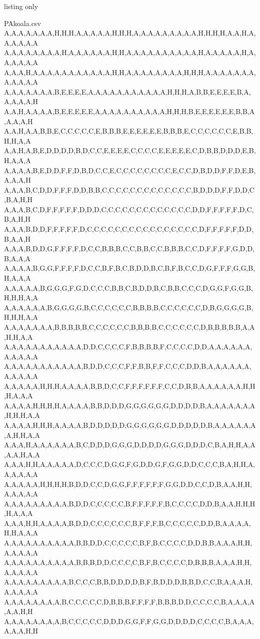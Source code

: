 \documentclass{article}
\begin{document}
\begin{PresentationCode}{listing only}
\begin{filecontents*}[overwrite]{PAkoala.csv}
A,A,A,A,A,A,A,H,H,H,A,A,A,A,A,H,H,H,A,A,A,A,A,A,A,A,A,H,H,H,H,A,A,H,A,A,A,A,A,A
A,A,A,A,A,A,A,A,H,A,A,A,A,A,A,H,H,A,A,A,A,A,A,A,A,A,A,H,A,A,A,A,A,H,A,A,A,A,A,A
A,A,A,H,A,A,A,A,A,A,A,A,A,A,A,H,H,A,A,A,A,A,A,A,A,H,H,H,A,A,A,A,A,A,A,A,A,A,A,A
A,A,A,A,A,A,A,B,E,E,E,E,A,A,A,A,A,A,A,A,A,A,A,H,H,H,A,B,B,E,E,E,E,B,A,A,A,A,A,H
A,A,H,A,A,A,A,B,E,E,E,E,E,A,A,A,A,A,A,A,A,A,A,H,H,H,B,E,E,E,E,E,E,B,B,A,A,A,A,H
A,A,H,A,A,B,B,E,C,C,C,C,C,E,B,B,B,E,E,E,E,E,E,B,B,B,E,C,C,C,C,C,C,E,B,B,H,H,A,A
A,A,H,A,B,E,D,D,D,D,B,D,C,C,E,E,E,E,C,C,C,C,E,E,E,E,E,C,D,B,B,D,D,D,E,B,H,A,A,A
A,A,A,A,B,E,D,D,F,F,D,B,D,C,C,E,C,C,C,C,C,C,C,C,E,C,C,D,B,D,D,F,F,D,E,B,A,A,A,H
A,A,A,B,C,D,D,F,F,F,D,D,B,B,C,C,C,C,C,C,C,C,C,C,C,C,C,B,D,D,D,F,F,D,D,C,B,A,H,H
A,A,A,B,C,D,F,F,F,F,F,D,D,D,C,C,C,C,C,C,C,C,C,C,C,C,C,D,D,F,F,F,F,F,D,C,B,A,H,H
A,A,A,B,D,D,F,F,F,F,F,D,C,C,C,C,C,C,C,C,C,C,C,C,C,C,C,C,D,F,F,F,F,F,D,D,B,A,A,H
A,A,A,B,D,D,G,F,F,F,F,D,C,C,B,B,B,C,C,B,B,C,C,B,B,B,C,C,D,F,F,F,F,G,D,D,B,A,A,A
A,A,A,A,B,G,G,F,F,F,F,D,C,C,B,F,B,C,B,D,D,B,C,B,F,B,C,C,D,G,F,F,F,G,G,B,H,A,A,A
A,A,A,A,A,B,G,G,G,F,G,D,C,C,C,B,B,C,B,D,D,B,C,B,B,C,C,C,D,G,G,F,G,G,B,H,H,H,A,A
A,A,A,A,A,A,B,G,G,G,G,B,C,C,C,C,C,C,B,B,B,B,C,C,C,C,C,C,D,B,G,G,G,G,B,H,H,H,A,A
A,A,A,A,A,A,A,B,B,B,B,B,C,C,C,C,C,C,B,B,B,B,C,C,C,C,C,C,D,B,B,B,B,B,A,A,H,H,A,A
A,A,A,A,A,A,A,A,A,A,A,D,D,C,C,C,C,F,B,B,B,B,F,C,C,C,C,D,D,A,A,A,A,A,A,A,A,A,A,A
A,A,A,A,A,A,A,A,A,A,A,B,D,D,C,C,C,F,F,B,B,F,F,C,C,C,D,D,B,A,A,A,A,A,A,A,A,A,A,A
A,A,A,A,A,H,H,H,A,A,A,A,B,B,D,C,C,F,F,F,F,F,F,C,C,D,B,B,A,A,A,A,A,A,H,H,H,A,A,A
A,A,A,A,H,H,H,H,A,A,A,A,B,B,D,D,D,G,G,G,G,G,G,D,D,D,D,B,A,A,A,A,A,A,A,H,H,H,A,A
A,A,A,A,H,H,H,A,A,A,A,B,D,D,D,D,D,G,G,G,G,G,G,D,D,D,D,D,B,A,A,A,A,A,A,A,H,H,A,A
A,A,A,H,A,A,A,A,A,A,B,C,D,D,D,G,G,G,D,D,D,D,G,G,G,D,D,D,C,B,A,H,H,A,A,A,A,H,A,A
A,A,A,H,H,A,A,A,A,A,D,C,C,C,D,G,G,F,G,D,D,G,F,G,G,D,D,C,C,C,B,A,H,H,A,A,A,A,A,A
A,A,A,A,A,H,H,H,H,B,D,D,C,C,D,G,G,F,F,F,F,F,F,G,G,D,D,C,C,D,B,A,A,H,H,A,A,A,A,A
A,A,A,A,A,A,A,A,A,B,D,D,C,C,C,C,C,B,F,F,F,F,F,B,C,C,C,C,D,D,B,A,A,H,H,H,H,A,A,A
A,A,A,H,H,A,A,A,A,B,D,D,C,C,C,C,C,C,B,F,F,F,B,C,C,C,C,C,D,D,B,A,A,A,A,H,H,A,A,A
A,A,A,A,A,A,A,A,A,A,B,B,D,D,C,C,C,C,C,B,F,B,C,C,C,C,D,D,B,B,A,A,A,H,H,A,A,A,A,A
A,A,A,A,A,A,A,A,A,A,B,B,B,D,D,C,C,C,C,B,F,B,C,C,C,C,D,B,B,B,A,A,A,H,H,A,A,A,A,A
A,A,A,A,A,A,A,A,A,B,C,C,C,B,B,D,D,D,D,B,F,B,D,D,D,B,B,D,C,C,B,A,A,A,H,A,A,A,A,A
A,A,A,A,A,A,A,A,B,C,C,C,C,C,D,B,B,B,F,F,F,F,B,B,B,D,D,C,C,C,C,B,A,A,A,A,A,A,H,H
A,A,A,A,A,A,A,A,B,C,C,C,C,C,D,D,D,G,G,F,F,G,G,D,D,D,D,C,C,C,C,B,A,A,A,A,A,A,H,H

\end{filecontents*}
\end{PresentationCode}
\end{document}
